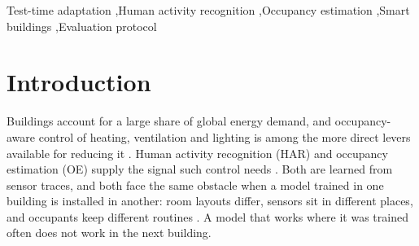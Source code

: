 \documentclass[a4paper,fleqn]{cas-dc}
\begin{document}
\begin{abstract}
Occupancy estimation reproduces the pattern on a different task, dataset and sensing
modality, and identifies the same cause independently. Of the nine features shared between the
offices, two correlate with occupancy in one and anti-correlate in the other, one of them
with day-level bootstrap intervals that exclude zero.
Removing them is a diagnostic rather than a deployable configuration, since identifying
which features reverse requires target labels, but it isolates the cause: it moves
cross-office transfer from MCC $-0.38$ to $+0.43$ and cuts the measured penalty in one
direction from $47.2$ points to $7.6$. Against the checkpoint whose predictions those
features undermine, PETAL and PeTTA gain over $50$ MCC points. Under the label-free
protocol both lose against the sound checkpoint in the other direction; restricting the
analysis to the seven diagnostic features leaves no broken checkpoint and reduces every
method's effect to at most $12$ points. We conclude that in this domain the effectiveness of test-time adaptation is
governed by the quality of the checkpoint being adapted and by the reliability of the
measurement, more than by the merits of the adaptation method.
\end{abstract}

\begin{keywords}
Test-time adaptation \sep Human activity recognition \sep Occupancy estimation
\sep Smart buildings \sep Evaluation protocol
\end{keywords}

\maketitle

\section{Introduction}
\label{sec:intro}

Buildings account for a large share of global energy demand, and occupancy-aware control of
heating, ventilation and lighting is among the more direct levers available for reducing
it \cite{manfren2021,amangeldy2025}. Human activity recognition (HAR) and occupancy
estimation (OE) supply the signal such control needs \cite{dridi2022,amayri2019}. Both are
learned from sensor traces, and both face the same obstacle when a model trained in one
building is installed in another: room layouts differ, sensors sit in different places, and
occupants keep different routines \cite{hong2017,shahbazian2023}. A model that works where
it was trained often does not work in the next building.
\end{document}
